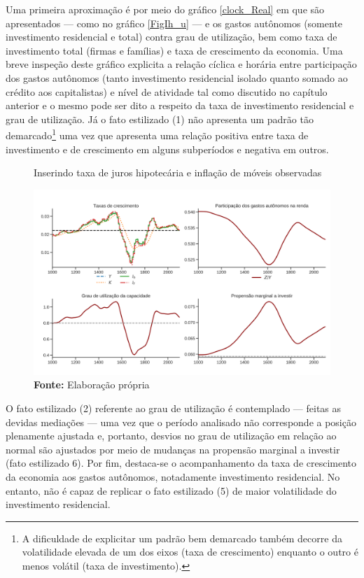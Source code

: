 Uma primeira aproximação é por meio do gráfico \ref{clock_Real} em que são apresentados --- como no gráfico \ref{FigIh_u} --- e  os gastos autônomos (somente investimento residencial e total) contra grau de utilização, bem como taxa de investimento total (firmas e famílias) e taxa de crescimento da economia.
Uma breve inspeção deste gráfico explicita a relação cíclica e horária entre participação dos gastos autônomos (tanto investimento residencial isolado quanto somado ao crédito aos capitalistas) e nível de atividade tal como discutido no capítulo anterior e o mesmo pode ser dito a respeito da taxa de investimento residencial e grau de utilização. Já o fato estilizado (1) não apresenta um padrão tão demarcado\footnote{A dificuldade de explicitar um padrão bem demarcado também decorre da volatilidade elevada de um dos eixos (taxa de crescimento) enquanto o outro é menos volátil (taxa de investimento).} uma vez que apresenta uma relação positiva entre taxa de investimento e de crescimento em alguns subperíodos e negativa em outros.

\begin{figure}[H]
	\centering
	\caption{Inserindo taxa de juros hipotecária e inflação de móveis observadas}
	\label{choque_Real}
	\includegraphics[width=\textwidth]{../../Modelo/Versoes/Shock_Real.png}
	\caption*{\textbf{Fonte:} Elaboração própria}
\end{figure}


O fato estilizado (2) referente ao grau de utilização é contemplado --- feitas as devidas mediações --- uma vez que o período analisado não corresponde a posição plenamente ajustada e, portanto, desvios no grau de utilização em relação ao normal são ajustados por meio de mudanças na propensão marginal a investir (fato estilizado 6). Por fim, destaca-se o acompanhamento da taxa de crescimento da economia aos gastos autônomos, notadamente investimento residencial. No entanto, não é capaz de replicar o fato estilizado (5) de maior volatilidade do investimento residencial.

